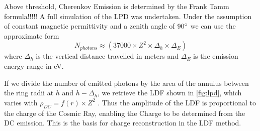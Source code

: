 \documentclass{article}
\begin{document}
Above threshold, Cherenkov Emission is determined by the Frank Tamm formula!!!!! A full simulation of the LPD was undertaken. Under the assumption of constant magnetic permittivity and a zenith angle of $90\degree$ we can use the approximate form \[ N_{photons} \approx (37000 \times Z^{2} \times \Delta_{h} \times \Delta_{E})\] where $\Delta_{h}$ is the vertical distance travelled in meters and $\Delta_{E}$ is the emission energy range in eV.

If we divide the number of emitted photons by the area of the annulus between the ring radii at $h$ and $h - \Delta_{h}$, we retrieve the LDF shown in \ref{fig:lpd}, which varies with $ \rho_{DC}  = f(r) \times Z^{2}$ . Thus the amplitude of the LDF is proportional to the charge of the Cosmic Ray, enabling the Charge to be determined from the DC emission. This is the basis for charge reconstruction in the LDF method.
\end{document}
